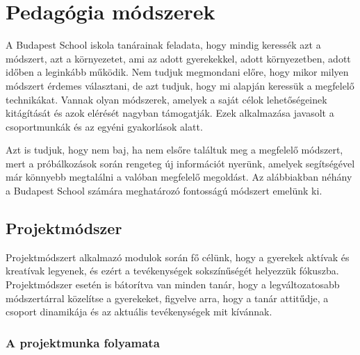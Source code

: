 \section{Pedagógia módszerek}
\label{sec:pedagogia_modszerek}

A Budapest School iskola tanárainak feladata, hogy mindig keressék azt a módszert, azt a környezetet, ami az adott gyerekekkel, adott környezetben, adott időben a leginkább működik. Nem tudjuk megmondani előre, hogy mikor milyen módszert érdemes választani, de azt tudjuk, hogy mi alapján keressük a megfelelő technikákat. Vannak olyan módszerek, amelyek a saját célok lehetőségeinek kitágítását és azok elérését nagyban támogatják. Ezek alkalmazása javasolt a csoportmunkák és az egyéni gyakorlások alatt.

Azt is tudjuk, hogy nem baj, ha nem elsőre találtuk meg a megfelelő módszert, mert a próbálkozások során rengeteg új információt nyerünk, amelyek segítségével már könnyebb megtalálni a valóban megfelelő megoldást. Az alábbiakban néhány a Budapest School számára meghatározó fontosságú módszert emelünk ki.

\subsection{Projektmódszer}
Projektmódszert alkalmazó modulok során fő célünk, hogy a gyerekek aktívak és kreatívak legyenek, és ezért a tevékenységek sokszínűségét helyezzük fókuszba. Projektmódszer esetén is bátorítva van minden tanár, hogy a legváltozatosabb módszertárral közelítse a gyerekeket, figyelve arra, hogy a tanár attitűdje, a csoport dinamikája és az aktuális tevékenységek mit kívánnak.

\subsubsection{A projektmunka folyamata}

